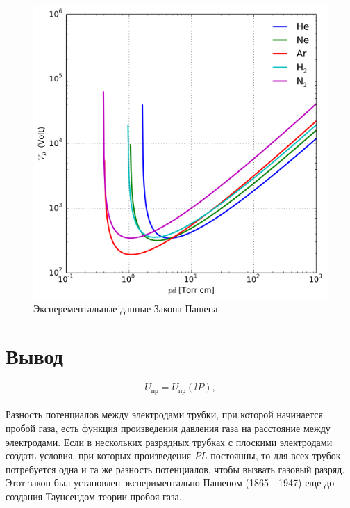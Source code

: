 \documentclass[a4paper, 12pt]{article}
\begin{document}
\begin{figure}[H]
        \centering
        \includegraphics[scale=0.33]{./pics/pashean_lines.png}
        \caption{Эксперементальные данные Закона Пашена}
\end{figure}


\newpage

\section{Вывод}

\begin{equation*}
    U_{\text{пр}} = U_{\text{пр}}(lP),
\end{equation*}
\\
Разность потенциалов между электродами трубки,
при которой начинается пробой газа, есть функция произведения
давления газа на расстояние между электродами. Если в нескольких
разрядных трубках с плоскими электродами создать условия,
при которых произведения $PL$ постоянны, то для всех трубок потребуется
одна и та же разность потенциалов, чтобы вызвать газовый
разряд. Этот закон был установлен экспериментально Пашеном (1865—1947) еще до создания Таунсендом теории пробоя газа.
\end{document}
